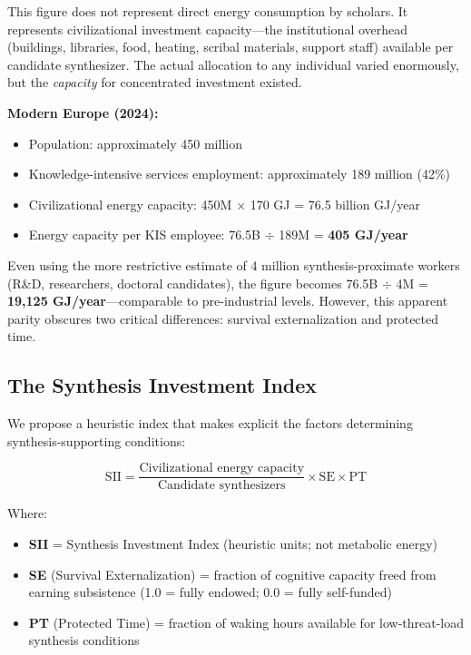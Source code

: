 This figure does not represent direct energy consumption by scholars. It represents civilizational investment capacity---the institutional overhead (buildings, libraries, food, heating, scribal materials, support staff) available per candidate synthesizer. The actual allocation to any individual varied enormously, but the \textit{capacity} for concentrated investment existed.

\textbf{Modern Europe (2024):}

\begin{itemize}
    \item Population: approximately 450 million
    \item Knowledge-intensive services employment: approximately 189 million (42\%)
    \item Civilizational energy capacity: 450M $\times$ 170 GJ = 76.5 billion GJ/year
    \item Energy capacity per KIS employee: 76.5B $\div$ 189M = \textbf{405 GJ/year}
\end{itemize}

Even using the more restrictive estimate of 4 million synthesis-proximate workers (R\&D, researchers, doctoral candidates), the figure becomes 76.5B $\div$ 4M = \textbf{19,125 GJ/year}---comparable to pre-industrial levels. However, this apparent parity obscures two critical differences: survival externalization and protected time.

\subsection{The Synthesis Investment Index}

We propose a heuristic index that makes explicit the factors determining synthesis-supporting conditions:

\begin{equation}
\text{SII} = \frac{\text{Civilizational energy capacity}}{\text{Candidate synthesizers}} \times \text{SE} \times \text{PT}
\label{eq:sii}
\end{equation}

Where:
\begin{itemize}
    \item \textbf{SII} = Synthesis Investment Index (heuristic units; not metabolic energy)
    \item \textbf{SE} (Survival Externalization) = fraction of cognitive capacity freed from earning subsistence (1.0 = fully endowed; 0.0 = fully self-funded)
    \item \textbf{PT} (Protected Time) = fraction of waking hours available for low-threat-load synthesis conditions
\end{itemize}

